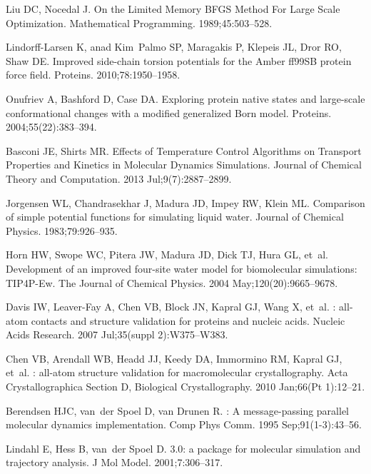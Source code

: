 \documentclass[10pt,letterpaper]{article}
\begin{document}
\begin{thebibliography}{100}
Liu DC, Nocedal J.
\newblock On the Limited Memory {BFGS} Method For Large Scale Optimization.
\newblock Mathematical Programming. 1989;45:503--528.

Lindorff-Larsen K, anad Kim~Palmo SP, Maragakis P, Klepeis JL, Dror RO, Shaw
  DE.
\newblock Improved side-chain torsion potentials for the {Amber} {ff99SB}
  protein force field.
\newblock Proteins. 2010;78:1950--1958.

Onufriev A, Bashford D, Case DA.
\newblock Exploring protein native states and large-scale conformational
  changes with a modified generalized {Born} model.
\newblock Proteins. 2004;55(22):383--394.

Basconi JE, Shirts MR.
\newblock Effects of {Temperature} {Control} {Algorithms} on {Transport}
  {Properties} and {Kinetics} in {Molecular} {Dynamics} {Simulations}.
\newblock Journal of Chemical Theory and Computation. 2013 Jul;9(7):2887--2899.

Jorgensen WL, Chandrasekhar J, Madura JD, Impey RW, Klein ML.
\newblock Comparison of simple potential functions for simulating liquid water.
\newblock Journal of Chemical Physics. 1983;79:926--935.

Horn HW, Swope WC, Pitera JW, Madura JD, Dick TJ, Hura GL, et~al.
\newblock Development of an improved four-site water model for biomolecular
  simulations: {TIP}4P-{Ew}.
\newblock The Journal of Chemical Physics. 2004 May;120(20):9665--9678.

Davis IW, Leaver-Fay A, Chen VB, Block JN, Kapral GJ, Wang X, et~al.
: all-atom contacts and structure validation for proteins
  and nucleic acids.
\newblock Nucleic Acids Research. 2007 Jul;35(suppl 2):W375--W383.

Chen VB, Arendall WB, Headd JJ, Keedy DA, Immormino RM, Kapral GJ, et~al.
: all-atom structure validation for macromolecular
  crystallography.
\newblock Acta Crystallographica Section D, Biological Crystallography. 2010
  Jan;66(Pt 1):12--21.

Berendsen HJC, van~der Spoel D, van Drunen R.
: {A} message-passing parallel molecular dynamics
  implementation.
\newblock Comp Phys Comm. 1995 Sep;91(1-3):43--56.

Lindahl E, Hess B, van~der Spoel D.
 3.0: a package for molecular simulation and trajectory
  analysis.
\newblock J Mol Model. 2001;7:306--317.


\end{thebibliography}
\end{document}
